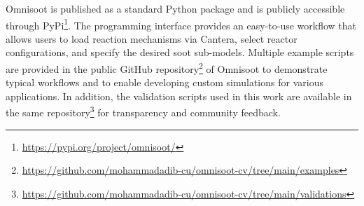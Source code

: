 Omnisoot is published as a standard Python package and is publicly accessible through PyPi\footnote{\href{https://pypi.org/project/omnisoot/}{https://pypi.org/project/omnisoot/}}. The programming interface provides an easy-to-use workflow that allows users to load reaction mechanisms via Cantera, select reactor configurations, and specify the desired soot sub-models. Multiple example scripts are provided in the public GitHub repository\footnote{\href{https://github.com/mohammadadib-cu/omnisoot-cv/tree/main/examples}{https://github.com/mohammadadib-cu/omnisoot-cv/tree/main/examples}} of Omnisoot to demonstrate typical workflows and to enable developing custom simulations for various applications. In addition, the validation scripts used in this work are available in the same repository\footnote{\href{https://github.com/mohammadadib-cu/omnisoot-cv/tree/main/validations}{https://github.com/mohammadadib-cu/omnisoot-cv/tree/main/validations}} for transparency and community feedback.



